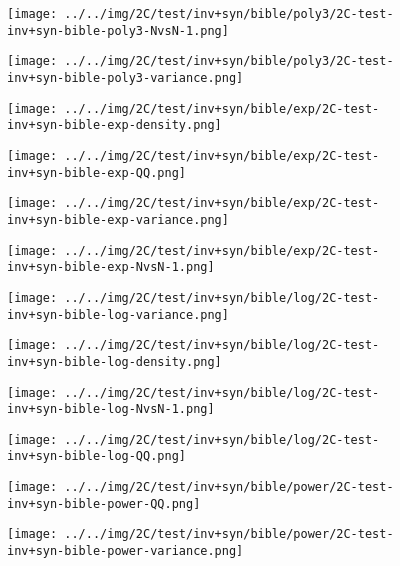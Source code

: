 \begin{figure}[H]
\centering	\texttt{[image: ../../img/2C/test/inv+syn/bible/poly3/2C-test-inv+syn-bible-poly3-NvsN-1.png]}
\end{figure}
\begin{figure}[H]
\centering	\texttt{[image: ../../img/2C/test/inv+syn/bible/poly3/2C-test-inv+syn-bible-poly3-variance.png]}
\end{figure}
\begin{figure}[H]
\centering	\texttt{[image: ../../img/2C/test/inv+syn/bible/exp/2C-test-inv+syn-bible-exp-density.png]}
\end{figure}
\begin{figure}[H]
\centering	\texttt{[image: ../../img/2C/test/inv+syn/bible/exp/2C-test-inv+syn-bible-exp-QQ.png]}
\end{figure}
\begin{figure}[H]
\centering	\texttt{[image: ../../img/2C/test/inv+syn/bible/exp/2C-test-inv+syn-bible-exp-variance.png]}
\end{figure}
\begin{figure}[H]
\centering	\texttt{[image: ../../img/2C/test/inv+syn/bible/exp/2C-test-inv+syn-bible-exp-NvsN-1.png]}
\end{figure}
\begin{figure}[H]
\centering	\texttt{[image: ../../img/2C/test/inv+syn/bible/log/2C-test-inv+syn-bible-log-variance.png]}
\end{figure}
\begin{figure}[H]
\centering	\texttt{[image: ../../img/2C/test/inv+syn/bible/log/2C-test-inv+syn-bible-log-density.png]}
\end{figure}
\begin{figure}[H]
\centering	\texttt{[image: ../../img/2C/test/inv+syn/bible/log/2C-test-inv+syn-bible-log-NvsN-1.png]}
\end{figure}
\begin{figure}[H]
\centering	\texttt{[image: ../../img/2C/test/inv+syn/bible/log/2C-test-inv+syn-bible-log-QQ.png]}
\end{figure}
\begin{figure}[H]
\centering	\texttt{[image: ../../img/2C/test/inv+syn/bible/power/2C-test-inv+syn-bible-power-QQ.png]}
\end{figure}
\begin{figure}[H]
\centering	\texttt{[image: ../../img/2C/test/inv+syn/bible/power/2C-test-inv+syn-bible-power-variance.png]}
\end{figure}
